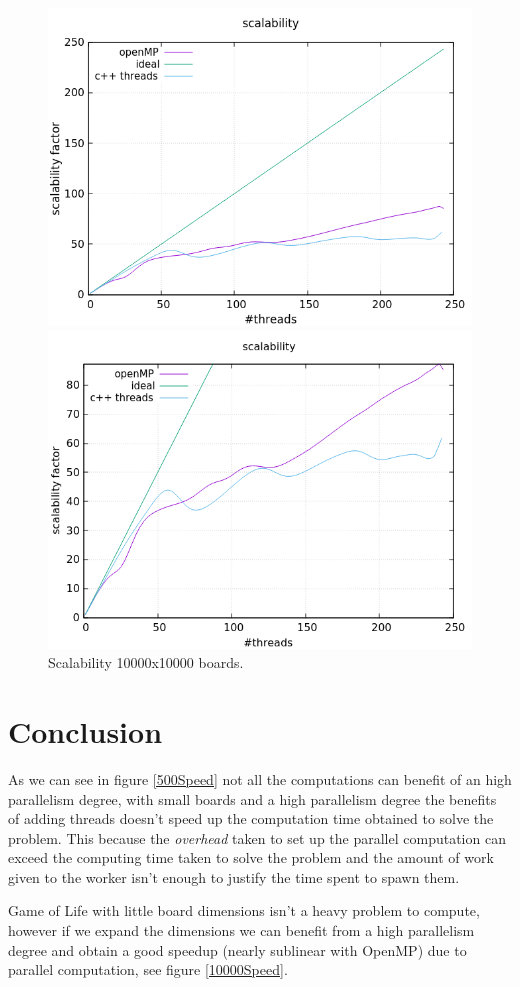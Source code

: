 \documentclass[a4paper,10pt]{article}
\begin{document}
\begin{figure}[H]
	\centering
	\begin{minipage}[t]{0.55\linewidth}
		\includegraphics[width=\linewidth]{10000_standard_scal.png}
	\end{minipage}%
	\begin{minipage}[t]{0.55\linewidth}
		\includegraphics[width=\linewidth]{10000_zoomed_scal.png}
	\end{minipage}
	\caption{Scalability 10000x10000 boards.}
	\label{10000Scal}
\end{figure}

\section{Conclusion}
As we can see in figure \ref{500Speed} not all the computations can benefit of an high parallelism degree, with small boards and a high parallelism degree the benefits of adding threads doesn't speed up the computation time obtained to solve the problem. This because the \textit{overhead} taken to set up the parallel computation can exceed the computing time taken to solve the problem and the amount of work given to the worker isn't enough to justify the time spent to spawn them. 

Game of Life with little board dimensions isn't a heavy problem to compute, however if we expand the dimensions we can benefit from a high parallelism degree and obtain a good speedup (nearly sublinear with OpenMP) due to parallel computation, see figure \ref{10000Speed}. 
\end{document}

